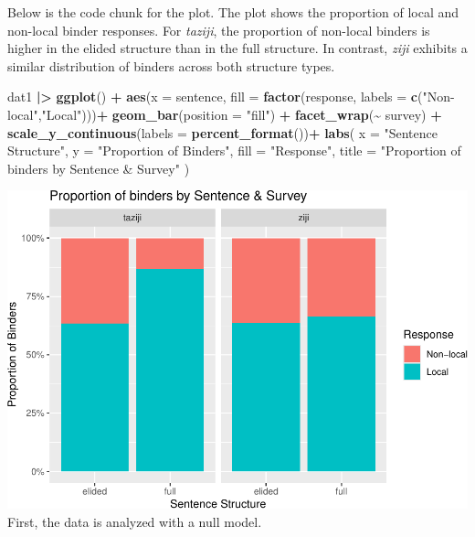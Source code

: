 \documentclass[
  man]{apa6}
\newenvironment{Shaded}{\begin{snugshade}}{\end{snugshade}}
\newcommand{\AttributeTok}[1]{\textcolor[rgb]{0.13,0.29,0.53}{#1}}
\newcommand{\FunctionTok}[1]{\textcolor[rgb]{0.13,0.29,0.53}{\textbf{#1}}}
\newcommand{\NormalTok}[1]{#1}
\newcommand{\SpecialCharTok}[1]{\textcolor[rgb]{0.81,0.36,0.00}{\textbf{#1}}}
\newcommand{\StringTok}[1]{\textcolor[rgb]{0.31,0.60,0.02}{#1}}
\begin{document}
Below is the code chunk for the plot. The plot shows the proportion of local and non-local binder responses. For \emph{taziji}, the proportion of non-local binders is higher in the elided structure than in the full structure. In contrast, \emph{ziji} exhibits a similar distribution of binders across both structure types.

\begin{Shaded}
\begin{Highlighting}[]
\NormalTok{dat1 }\SpecialCharTok{|\textgreater{}} 
  \FunctionTok{ggplot}\NormalTok{() }\SpecialCharTok{+}
  \FunctionTok{aes}\NormalTok{(}\AttributeTok{x =}\NormalTok{ sentence, }\AttributeTok{fill =} \FunctionTok{factor}\NormalTok{(response, }\AttributeTok{labels =} \FunctionTok{c}\NormalTok{(}\StringTok{"Non{-}local"}\NormalTok{,}\StringTok{"Local"}\NormalTok{)))}\SpecialCharTok{+}
  \FunctionTok{geom\_bar}\NormalTok{(}\AttributeTok{position =} \StringTok{"fill"}\NormalTok{) }\SpecialCharTok{+}
  \FunctionTok{facet\_wrap}\NormalTok{(}\SpecialCharTok{\textasciitilde{}}\NormalTok{ survey) }\SpecialCharTok{+}
  \FunctionTok{scale\_y\_continuous}\NormalTok{(}\AttributeTok{labels =} \FunctionTok{percent\_format}\NormalTok{())}\SpecialCharTok{+}
  \FunctionTok{labs}\NormalTok{(}
    \AttributeTok{x     =} \StringTok{"Sentence Structure"}\NormalTok{,}
    \AttributeTok{y     =} \StringTok{"Proportion of Binders"}\NormalTok{,}
    \AttributeTok{fill  =} \StringTok{"Response"}\NormalTok{,}
    \AttributeTok{title =} \StringTok{"Proportion of binders by Sentence \& Survey"}
\NormalTok{  ) }
\end{Highlighting}
\end{Shaded}

\includegraphics{index_files/figure-latex/unnamed-chunk-3-1.pdf}
First, the data is analyzed with a null model.
\end{document}
